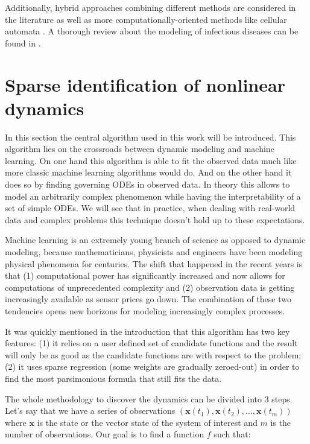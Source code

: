 \documentclass[12pt, letterpaper]{article}
\begin{document}
Additionally, hybrid approaches combining different methods are considered in the literature \cite{} as well as more computationally-oriented methods like cellular automata \cite{}. A thorough review about the modeling of infectious diseases can be found in \cite{}.

\section{Sparse identification of nonlinear dynamics}\label{sec:sindy}

In this section the central algorithm used in this work will be introduced. This algorithm lies on the crossroads between dynamic modeling and machine learning. On one hand this algorithm is able to fit the observed data much like more classic machine learning algorithms would do. And on the other hand it does so by finding governing ODEs in observed data. In theory this allows to model an arbitrarily complex phenomenon while having the interpretability of a set of simple ODEs. We will see that in practice, when dealing with real-world data and complex problems this technique doesn't hold up to these expectations.

Machine learning is an extremely young branch of science as opposed to dynamic modeling, because mathematicians, physicists and engineers have been modeling physical phenomena for centuries. The shift that happened in the recent years is that (1) computational power has significantly increased and now allows for computations of unprecedented complexity and (2) observation data is getting increasingly available as sensor prices go down. The combination of these two tendencies opens new horizons for modeling increasingly complex processes.  


It was quickly mentioned in the introduction that this algorithm has two key features: (1) it relies on a user defined set of candidate functions and the result will only be as good as the candidate functions are with respect to the problem; (2) it uses sparse regression (some weights are gradually zeroed-out) in order to find the most parsimonious formula that still fits the data.

The whole methodology to discover the dynamics can be divided into 3 steps. Let's say that we have a series of observations $(\mathbf{x}(t_1), \mathbf{x}(t_2), \dots, \mathbf{x}(t_m))$ where $\mathbf{x}$ is the state or the vector state of the system of interest and $m$ is the number of observations. Our goal is to find a function $f$ such that:
\end{document}
